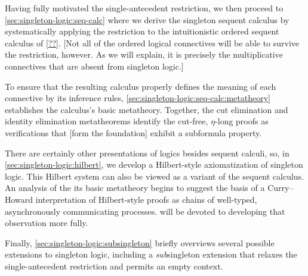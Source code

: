 Having fully motivated the single-antecedent restriction, we then proceed to \cref{sec:singleton-logic:seq-calc} where we derive the singleton sequent calculus by systematically applying the restriction to the intuitionistic ordered sequent calculus of \cref{??}.
[Not all of the ordered logical connectives will be able to survive the restriction, however.
As we will explain, it is precisely the multiplicative connectives that are absent from singleton logic.]

To ensure that the resulting calculus properly defines the meaning of each connective by its inference rules, \cref{sec:singleton-logic:seq-calc:metatheory} establishes the calculus's basic metatheory.
Together, the cut elimination and identity elimination metatheorems identify the cut-free, $\eta$-long proofs as verifications that [form the foundation] exhibit a subformula property.


There are certainly other presentations of logics besides sequent calculi, so, in \cref{sec:singleton-logic:hilbert}, we develop a Hilbert-style axiomatization of singleton logic.
This Hilbert system can also be viewed as a variant of the sequent calculus.
An analysis of the its basic metatheory begins to suggest the basis of a Curry--Howard interpretation of Hilbert-style proofs as chains of well-typed, asynchronously communicating processes.
 will be devoted to developing that observation more fully.




Finally, \cref{sec:singleton-logic:subsingleton} briefly overviews several possible extensions to singleton logic, including a \emph{sub}\-singleton extension that relaxes the single-antecedent restriction and permits an empty context.



